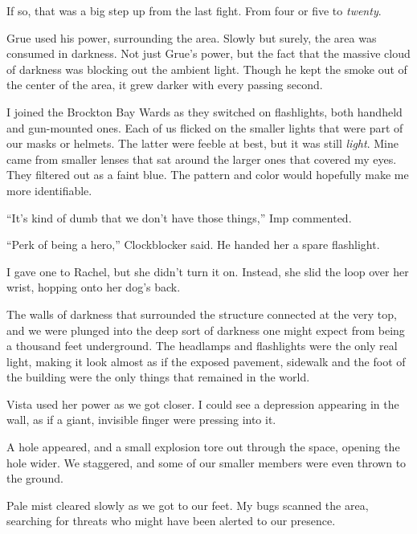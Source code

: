 If so, that was a big step up from the last fight.  From four or five to \emph{twenty}.



Grue used his power, surrounding the area.  Slowly but surely, the area was consumed in darkness.  Not just Grue's power, but the fact that the massive cloud of darkness was blocking out the ambient light.  Though he kept the smoke out of the center of the area, it grew darker with every passing second.



I joined the Brockton Bay Wards as they switched on flashlights, both handheld and gun-mounted ones.  Each of us flicked on the smaller lights that were part of our masks or helmets.  The latter were feeble at best, but it was still \emph{light}.  Mine came from smaller lenses that sat around the larger ones that covered my eyes.  They filtered out as a faint blue.  The pattern and color would hopefully make me more identifiable.



``It's kind of dumb that we don't have those things,'' Imp commented.



``Perk of being a hero,'' Clockblocker said.  He handed her a spare flashlight.



I gave one to Rachel, but she didn't turn it on.  Instead, she slid the loop over her wrist, hopping onto her dog's back.



The walls of darkness that surrounded the structure connected at the very top, and we were plunged into the deep sort of darkness one might expect from being a thousand feet underground.  The headlamps and flashlights were the only real light, making it look almost as if the exposed pavement, sidewalk and the foot of the building were the only things that remained in the world.



Vista used her power as we got closer.  I could see a depression appearing in the wall, as if a giant, invisible finger were pressing into it.



A hole appeared, and a small explosion tore out through the space, opening the hole wider.  We staggered, and some of our smaller members were even thrown to the ground.



Pale mist cleared slowly as we got to our feet.  My bugs scanned the area, searching for threats who might have been alerted to our presence.




